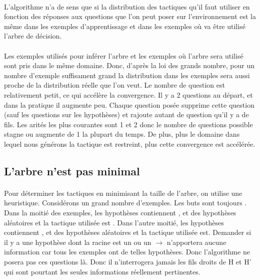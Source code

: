\paragraph{}
L'algorithme n'a de sens que si la distribution des tactiques qu'il faut utiliser en fonction des réponses aux questions que l'on peut poser sur l'environnement est la même dans les exemples d'apprentissage et dans les exemples où va être utilisé l'arbre de décision.

\paragraph{}
Les exemples utilisés pour inférer l'arbre et les exemples où l'arbre sera utilisé sont pris dans le même domaine. Donc, d'après la loi des grands nombre, pour un nombre d'exemple suffisament grand la distribution dans les exemples sera aussi proche de la distribution réelle que l'on veut. Le nombre de question est relativement petit, ce qui accélère la convergence. Il y a 2 questions au départ, et dans la pratique il augmente peu. Chaque question posée supprime cette question (sauf les questions sur les hypothèses) et rajoute autant de question qu'il y a de fils. Les arités les plus courantes sont 1 et 2 donc le nombre de questions possible stagne ou augmente de 1 la plupart du temps. De plus, plus le domaine dans lequel nous générons la tactique est restreint, plus cette convergence est accélérée. 

\subsection*{L'arbre n'est pas minimal}
\paragraph{}Pour déterminer les tactiques en minimisant la taille de l'arbre, on utilise une heuristique. Considérons un grand nombre d'exemples. Les buts sont toujours . Dans la moitié des exemples, les hypothèses contiennent ,  et des hypothèses aléatoires et la tactique utilisée est . Dans l'autre moitié, les hypothèses contiennent ,  et des hypothèses aléatoires et la tactique utilisée est. Demander si il y a une hypothèse dont la racine est un \code{=} ou un $\rightarrow$ n'apportera aucune information car tous les exemples ont de telles hypothèses. Donc l'algorithme ne posera pas ces questions là. Donc il n'interrogera jamais les fils droits de H et H' qui sont pourtant les seules informations réellement pertinentes.

